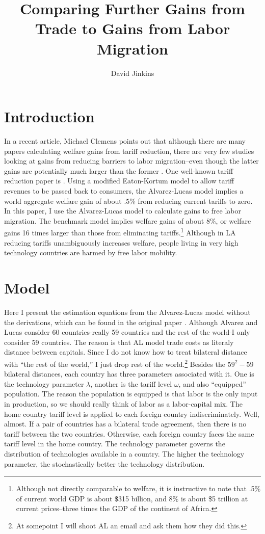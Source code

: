 \documentclass{article}
\title{Comparing Further Gains from Trade to Gains from Labor Migration}
\author{David Jinkins}
\begin{document}
\maketitle

\section{Introduction}
In a recent article, Michael Clemens points out that although there are many papers calculating welfare gains from tariff reduction, there are very few studies looking at gains from reducing barriers to labor migration--even though the latter gains are potentially much larger than the former \citep{Clemens2011} . One well-known tariff reduction paper is \citet{AlvarezLucas2007}.  Using a modified Eaton-Kortum model to allow tariff revenues to be passed back to consumers, the Alvarez-Lucas model implies a world aggregate welfare gain of about .5\% from reducing current tariffs to zero.  In this paper, I use the Alvarez-Lucas model to calculate gains to free labor migration.  The benchmark model implies welfare gains of about 8\%, or welfare gains 16 times larger than those from eliminating tariffs.\footnote{Although not directly comparable to welfare, it is instructive to note that .5\% of current world GDP is about \$315 billion, and 8\% is about \$5 trillion at current prices--three times the GDP of the continent of Africa.}    Although in LA reducing tariffs unambiguously increases welfare, people living in very high technology countries are harmed by free labor mobility. 

\section{Model}
Here I present the estimation equations from the Alvarez-Lucas model without the derivations, which can be found in the original paper \citep{AlvarezLucas2007}.  Although Alvarez and Lucas consider 60 countries-really 59 countries and the rest of the world-I only consider 59 countries.  The reason is that AL model trade costs as literaly distance between capitals.  Since I do not know how to treat bilateral distance with ``the rest of the world,'' I just drop rest of the world.\footnote{At somepoint I will shoot AL an email and ask them how they did this.}  Besides the $59^2-59$ bilateral distances, each country has three parameters associated with it.  One is the technology parameter $\lambda$, another is the tariff level $\omega$, and also ``equipped'' population.  The reason the population is equipped is that labor is the only input in production, so we should really think of labor as a labor-capital mix.  The home country tariff level is applied to each foreign country indiscriminately.  Well, almost.  If a pair of countries has a bilateral trade agreement, then there is no tariff between the two countries.  Otherwise, each foreign country faces the same tariff level in the home country.  The technology parameter governs the distribution of technologies available in a country.  The higher the technology parameter, the stochastically better the technology distribution.
\end{document}
